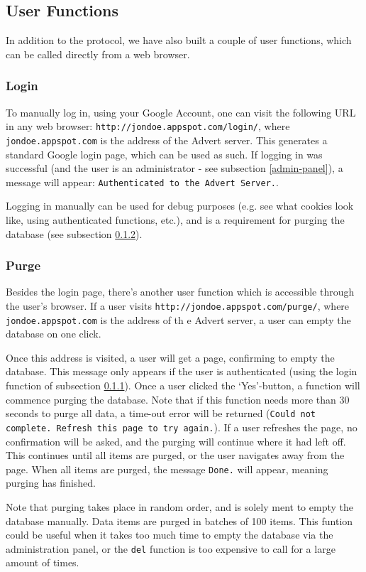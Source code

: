 \subsection{User Functions}
In addition to the protocol, we have also built a couple of user functions,
which can be called directly from a web browser.

\subsubsection{Login}
\label{login}
To manually log in, using your Google Account, one can visit the following URL
in any web browser: \texttt{http://jondoe.appspot.com/login/}, where
\texttt{jondoe.appspot.com} is the address of the Advert server. This generates
a standard Google login page, which can be used as such. If logging in was
successful (and the user is an administrator - see subsection \ref{admin-panel}),
a message will appear: \texttt{Authenticated to the Advert Server.}.

Logging in manually can be used for debug purposes (e.g. see what cookies look
like, using authenticated functions, etc.), and is a requirement for purging
the database (see subsection \ref{purge}).

\subsubsection{Purge}
\label{purge}
Besides the login page, there's another user function which is accessible
through the user's browser. If a user visits
\texttt{http://jondoe.appspot.com/purge/}, where \texttt{jondoe.appspot.com} is the
address of th e Advert server, a user can empty the database on one click. 

Once this address is visited, a user will get a page, confirming to empty the
database. This message only appears if the user is authenticated (using the
login function of subsection \ref{login}). Once a user clicked the `Yes'-button, a
function will commence purging the database. Note that if this function needs
more than 30 seconds to purge all data, a time-out error will be returned
(\texttt{Could not complete. Refresh this page to try again.}). If a user
refreshes the page, no confirmation will be asked, and the purging will
continue where it had left off. This continues until all items are purged, or
the user navigates away from the page. When all items are purged, the message 
\texttt{Done.} will appear, meaning purging has finished.

Note that purging takes place in random order, and is solely ment to empty the
database manually. Data items are purged in batches of 100 items. This funtion 
could be useful when it takes too much time to empty the database via the
administration panel, or the \texttt{del} function is too expensive to call for
a large amount of times.

